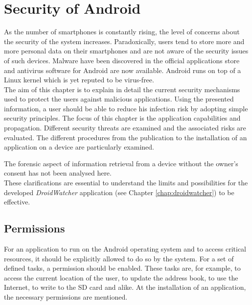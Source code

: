 \chapter{Security of Android}
\label{chap:and-secu}

As the number of smartphones is constantly rising, the level of concerns about the security of the system increases.
Paradoxically, users tend to store more and more personal data on their smartphones and are not aware of the security issues of such devices.
Malware have been discovered in the official applications store and antivirus software for Android are now available.
Android runs on top of a Linux kernel which is yet reputed to be virus-free.\\

The aim of this chapter is to explain in detail the current security mechanisms used to protect the users against malicious applications.
Using the presented information, a user should be able to reduce his infection risk by adopting simple security principles.
The focus of this chapter is the application capabilities and propagation.
Different security threats are examined and the associated risks are evaluated.
The different procedures from the publication to the installation of an application on a device are particularly examined.

The forensic aspect of information retrieval from a device without the owner's consent has not been analysed here.\\

These clarifications are essential to understand the limits and possibilities for the developed \emph{DroidWatcher} application (see Chapter \ref{chap:droidwatcher}) to be effective.

\section{Permissions}
\label{sec:permissions}

For an application to run on the Android operating system and to access critical resources, it should be explicitly allowed to do so by the system. %
For a set of defined tasks, a permission should be enabled.
These tasks are, for example, to access the current location of the user, to update the address book, to use the Internet, to write to the SD card and alike.
At the installation of an application, the necessary permissions are mentioned.\\

